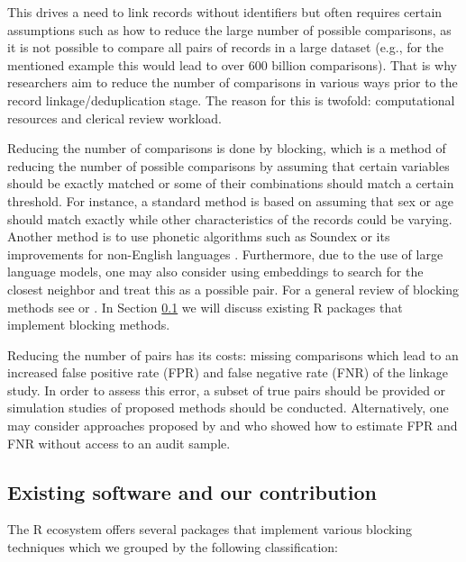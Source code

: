 This drives a need to link records without identifiers but often
requires certain assumptions such as how to reduce the large number of
possible comparisons, as it is not possible to compare all pairs of
records in a large dataset (e.g., for the mentioned example this would
lead to over 600 billion comparisons). That is why researchers aim to
reduce the number of comparisons in various ways prior to the record
linkage/deduplication stage. The reason for this is twofold:
computational resources and clerical review workload.

Reducing the number of comparisons is done by blocking, which is a
method of reducing the number of possible comparisons by assuming that
certain variables should be exactly matched or some of their
combinations should match a certain threshold. For instance, a standard
method is based on assuming that sex or age should match exactly while
other characteristics of the records could be varying. Another method is
to use phonetic algorithms such as Soundex \citep[cf.][]{Wright1960} or its
improvements for non-English languages \citep[cf.][]{Phonetic2020}. Furthermore,
due to the use of large language models, one may also consider using
embeddings \citep{mikolov2013efficient} to search for the closest neighbor
and treat this as a possible pair. For a general review of blocking
methods see \citet{Steorts2014} or \citet{Papadakis2020}. In Section
\ref{sec-software} we will discuss existing R packages that implement
blocking methods.

Reducing the number of pairs has its costs: missing comparisons which
lead to an increased false positive rate (FPR) and false negative rate
(FNR) of the linkage study. In order to assess this error, a subset of
true pairs should be provided or simulation studies of proposed methods
should be conducted. Alternatively, one may consider approaches proposed
by \citet{dasylva2021estimating} and \citet{dasylva2022consistent} who showed how to
estimate FPR and FNR without access to an audit sample.

\subsection{Existing software and our contribution}\label{sec-software}

The R ecosystem offers several packages that implement various blocking
techniques which we grouped by the following classification:

